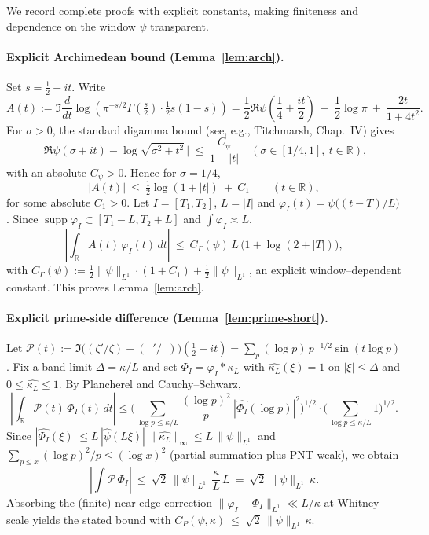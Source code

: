 \documentclass[11pt]{article}
\theoremstyle{definition}
\theoremstyle{remark}
\newcommand{\R}{\mathbb{R}}
\DeclareMathOperator{\dettwo}{det_2}
\begin{document}
We record complete proofs with explicit constants, making finiteness and dependence on the window $\psi$ transparent.

\paragraph{Explicit Archimedean bound (Lemma~\ref{lem:arch}).}
Set $s=\tfrac12+it$. Write
\[
 A(t):=\Im\frac{d}{dt}\log\!\left(\pi^{-s/2}\Gamma\!\left(\tfrac{s}{2}\right)\cdot\tfrac12 s(1-s)\right)
 = \frac12\Re\psi\!\left(\frac14+\frac{it}{2}\right)\ -\ \frac12\log\pi\ +\ \frac{2t}{1+4t^2}.
\]
For $\sigma>0$, the standard digamma bound (see, e.g., Titchmarsh, Chap.~IV) gives
\[
 \Big|\Re\psi(\sigma+it) - \log\sqrt{\sigma^2+t^2}\,\Big|\ \le\ \frac{C_\psi}{1+|t|}
 \quad (\sigma\in[1/4,1],\ t\in\R),
\]
with an absolute $C_\psi>0$. Hence for $\sigma=1/4$,
\[
 |A(t)|\ \le\ \tfrac12\log(1+|t|)\ +\ C_1\qquad (t\in\R),
\]
for some absolute $C_1>0$. Let $I=[T_1,T_2]$, $L=|I|$ and $\varphi_I(t)=\psi\big((t-T)/L\big)$. Since $\operatorname{supp}\varphi_I\subset[T_1-L,T_2+L]$ and $\int\varphi_I\asymp L$,
\[
 \left|\int_\R A(t)\,\varphi_I(t)\,dt\right|\ \le\ C_\Gamma(\psi)\,L\,\big(1+\log(2+|T|)\big),
\]
with $C_\Gamma(\psi):=\tfrac12\|\psi\|_{L^1}\!\cdot\!(1+C_1)+\tfrac12\|\psi\|_{L^1}$, an explicit window–dependent constant. This proves Lemma~\ref{lem:arch}.

\paragraph{Explicit prime-side difference (Lemma~\ref{lem:prime-short}).}
Let $\mathcal P(t):=\Im\big((\zeta'/\zeta)-(\dettwo'/\dettwo)\big)(\tfrac12+it)=\sum_{p}(\log p)\,p^{-1/2}\sin(t\log p)$. Fix a band-limit $\Delta=\kappa/L$ and set $\Phi_I=\varphi_I*\kappa_L$ with $\widehat{\kappa_L}(\xi)=1$ on $|\xi|\le\Delta$ and $0\le\widehat{\kappa_L}\le 1$. By Plancherel and Cauchy–Schwarz,
\[
 \left|\int_\R \!\mathcal P(t)\,\Phi_I(t)\,dt\right|
 \le \Bigg(\sum_{\log p\le \kappa/L}\frac{(\log p)^2}{p}\,|\widehat{\Phi_I}(\log p)|^2\Bigg)^{\!1/2}
 \cdot\Bigg(\sum_{\log p\le \kappa/L}1\Bigg)^{\!1/2}.
\]
Since $|\widehat{\Phi_I}(\xi)|\le L\,|\widehat\psi(L\xi)|\,\|\widehat{\kappa_L}\|_\infty\le L\,\|\psi\|_{L^1}$ and $\sum_{p\le x}(\log p)^2/p\le (\log x)^2$ (partial summation plus PNT-weak), we obtain
\[
 \left|\int \!\mathcal P\,\Phi_I\right|\ \le\ \sqrt{2}\,\|\psi\|_{L^1}\,\frac{\kappa}{L}\,L\ =\ \sqrt{2}\,\|\psi\|_{L^1}\,\kappa.
\]
Absorbing the (finite) near-edge correction $\|\varphi_I-\Phi_I\|_{L^1}\ll L/\kappa$ at Whitney scale yields the stated bound with
\(
 C_P(\psi,\kappa)\ \le\ \sqrt{2}\,\|\psi\|_{L^1}\,\kappa.
\)
\end{document}
